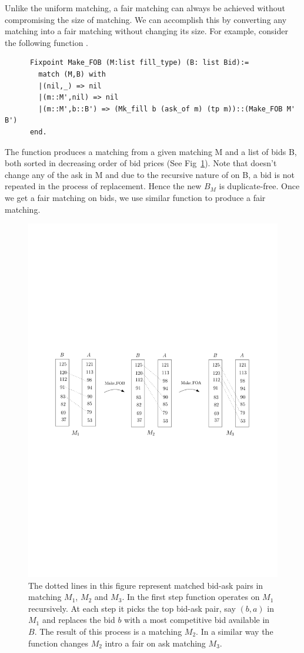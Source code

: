 \documentclass[a4paper,UKenglish,cleveref, autoref]{lipics-v2019}
\begin{document}
Unlike the uniform matching, a fair matching can always be achieved without compromising the size of matching. We can accomplish this by converting any matching into a fair matching without changing its size. For example, consider the following function .

\begin{verbatim}
	  Fixpoint Make_FOB (M:list fill_type) (B: list Bid):=
	    match (M,B) with 
	    |(nil,_) => nil
	    |(m::M',nil) => nil
	    |(m::M',b::B') => (Mk_fill b (ask_of m) (tp m))::(Make_FOB M' B')
	  end.
\end{verbatim}

The function  produces a  matching from a given matching M and a list of bids B, both sorted in decreasing order of bid prices (See Fig~\ref{fig:fair}).  Note that  doesn't change any of the ask in M and due to the recursive nature of  on B, a bid is not repeated in the process of replacement.  Hence the new $B_M$ is duplicate-free. Once we get a fair matching on bids, we use similar function  to produce a fair matching. 

\begin{figure}[h!]
\centering
\includegraphics[width=.6\textwidth]{make_fair.pdf}
\caption{The dotted lines in this figure represent  matched bid-ask pairs in  matching $M_1$, $M_2$ and $M_3$. In the first step function  operates on $M_1$ recursively. At each step it picks the top bid-ask pair, say $(b,a)$ in $M_1$ and replaces the bid  $b$ with a most competitive bid available in $B$. The result of this process is a  matching $M_2$. In a similar way the function  changes $M_2$ intro a fair on ask matching $M_3$.  }
\label{fig:fair}
\end{figure}
\end{document}
